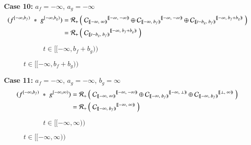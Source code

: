 \textbf{Case 10:} $a_f=-\infty$, $a_g =-\infty$
\begin{align*}
	(f^{[-\infty,b_f)} \;*\; g^{[-\infty,b_g)})
	= \R[+] &\left( \; 
			{\C[ [\![-\infty,\;\infty)\!) ]}^{[\![-\infty,\; -\infty)\!)} \oplus
			{\C[ [\![-\infty,\;b_f)\!) ]}^{[\![-\infty,\; -\infty)\!)} \oplus
			{\C[ [\![t-b_g,\;b_f)\!) ]}^{[\![-\infty,\; b_f+b_g)\!)} 
		\; \right) \\ 
	= \R[+] &\left( \; 
			{\C[ [\![t-b_g,\;b_f)\!) ]}^{[\![-\infty,\; b_f+b_g)\!)} 
		\; \right)
\end{align*}
\vspace{-1.5cm}
\begin{figure}[h]
	\centering
	\begin{subfigure}[h]{0.4\textwidth}
		\caption{$t \in [\![-\infty, b_f+b_g)\!)$} 
		\centering
	\end{subfigure}
\end{figure}


\textbf{Case 11:} $a_f=-\infty$, $a_g =-\infty$, $b_g=\infty$
\begin{align*}
	(f^{[-\infty,b_f)} \;*\; g^{[-\infty,\infty)})
	= \R[+] &\left( \; 
			{\C[ [\![-\infty,\;\infty)\!) ]}^{[\![-\infty,\; -\infty)\!)} \oplus
			{\C[ [\![-\infty,\;b_f)\!) ]}^{[\![-\infty,\; \bot)\!)} \oplus
			{\C[ [\![-\infty,\;b_f)\!) ]}^{[\![\bot,\; \infty)\!)} 
		\; \right) \\ 
	= \R[+] &\left( \; 
			{\C[ [\![-\infty,\;b_f)\!) ]}^{[\![-\infty,\; \infty)\!)}
		\; \right)
\end{align*}
\vspace{-1.5cm}
\begin{figure}[h]
	\centering
	\begin{subfigure}[h]{0.4\textwidth}
		\caption{$t \in [\![-\infty, \infty)\!)$} 
		\centering
	\end{subfigure}
\end{figure}



